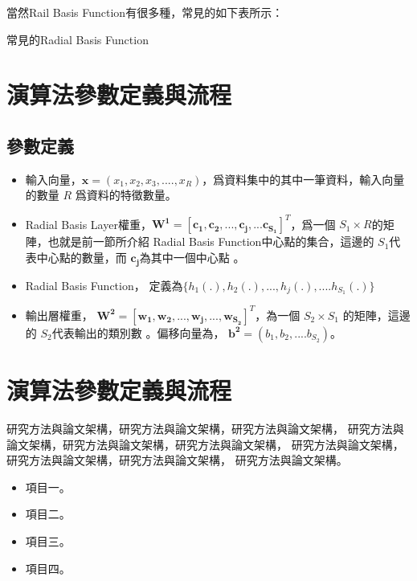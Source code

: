 當然Rail Basis Function有很多種，常見的如下表所示：
\\

\begin{table}[h!]
	\centering
	\label{tab:rbf_table}
	
	\caption{常見的Radial Basis Function}
\end{table}









\section{演算法參數定義與流程}




\subsection{參數定義}
\begin{itemize}
	\item
	      輸入向量，\(\mathbf{x} = (x_1,x_2,x_3,....,x_R)\)，爲資料集中的其中一筆資料，輸入向量的數量 \(R\) 爲資料的特徵數量。
	\item
		Radial Basis Layer權重，\(\mathbf{W^1} = [\mathbf{c_1,c_2,...,c_j,...c_{S_1}}]^T\)，爲一個 \(S_1 \times R \)的矩陣，也就是前一節所介紹 Radial Basis Function中心點的集合，這邊的 \(S_1\)代表中心點的數量，而 \(\mathbf{c_j}\)為其中一個中心點 。
	\item
		Radial Basis Function， 定義為\(\{h_1(.), h_2(.),...,h_j(.),....h_{S_1}(.) \}\)  
	\item
		輸出層權重， \(\mathbf{W^2}= [\mathbf{w_1,w_2,...,w_j,...,w_{S_2}}]^T\)，為一個 \(S_2 \times S_1\) 的矩陣，這邊的 \(S_2\)代表輸出的類別數 。偏移向量為， \(\mathbf{b^2}=(b_1,b_2,....b_{S_2})\)。 
\end{itemize}

\section {演算法參數定義與流程}
研究方法與論文架構，研究方法與論文架構，研究方法與論文架構，
研究方法與論文架構，研究方法與論文架構，研究方法與論文架構，
研究方法與論文架構，研究方法與論文架構，研究方法與論文架構，
研究方法與論文架構。

\begin{itemize}
	\item
	      項目一。
	\item
	      項目二。
	\item
	      項目三。
	\item
	      項目四。
\end{itemize}


